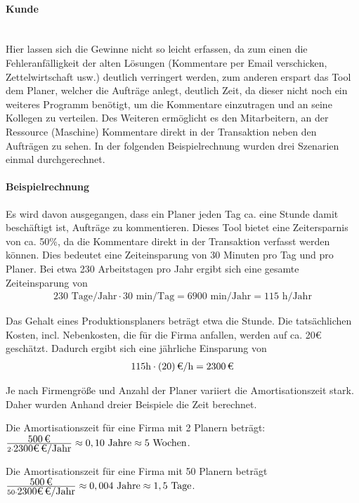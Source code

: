 \paragraph{Kunde}\mbox{} \\
Hier lassen sich die Gewinne nicht so leicht erfassen, da zum einen die Fehleranfälligkeit der alten Lösungen (Kommentare per Email verschicken, Zettelwirtschaft usw.) deutlich verringert werden, zum anderen erspart das Tool dem Planer, welcher die Aufträge anlegt, deutlich Zeit, da dieser nicht noch ein weiteres Programm benötigt, um die Kommentare einzutragen und an seine Kollegen zu verteilen. Des Weiteren ermöglicht es den Mitarbeitern, an der Ressource (Maschine) Kommentare direkt in der Transaktion neben den Aufträgen zu sehen. In der folgenden Beispielrechnung wurden drei Szenarien einmal durchgerechnet. 

\paragraph{Beispielrechnung}
Es wird davon ausgegangen, dass ein Planer jeden Tag ca. eine Stunde damit beschäftigt ist, Aufträge zu kommentieren. Dieses Tool bietet eine Zeitersparnis von ca. 50\%, da die Kommentare direkt in der Transaktion verfasst werden können. Dies bedeutet eine Zeiteinsparung von 30 Minuten pro Tag und pro Planer. Bei etwa 230 Arbeitstagen pro Jahr ergibt sich eine gesamte Zeiteinsparung von  
\begin{eqnarray}
230 \mbox{ Tage/Jahr} \cdot 30 \mbox{ min/Tag} = 6900 \mbox{ min/Jahr} = 115 \mbox{ h/Jahr} 
\end{eqnarray}

Das Gehalt eines Produktionsplaners beträgt etwa  die Stunde. Die tatsächlichen Kosten, incl. Nebenkosten, die für die Firma anfallen, werden auf ca. 20€ geschätzt. Dadurch ergibt sich eine jährliche Einsparung von 
\begin{eqnarray}
115 \mbox{h} \cdot \eur{(20)}{\mbox{/h}} = \eur{2300}
\end{eqnarray}

Je nach Firmengröße und Anzahl der Planer variiert die Amortisationszeit stark. Daher wurden Anhand dreier Beispiele die Zeit berechnet.

Die Amortisationszeit für eine Firma mit 2 Planern beträgt:
$\frac{\eur{500}}{2 \cdot \eur{2300€} \mbox{/Jahr} } \approx 0,10 \mbox{ Jahre} \approx 5 \mbox{ Wochen}$.

Die Amortisationszeit für eine Firma mit 50 Planern beträgt
$\frac{\eur{500}}{50 \cdot \eur{2300€} \mbox{/Jahr} } \approx 0,004 \mbox{ Jahre} \approx 1,5 \mbox{ Tage}$.

